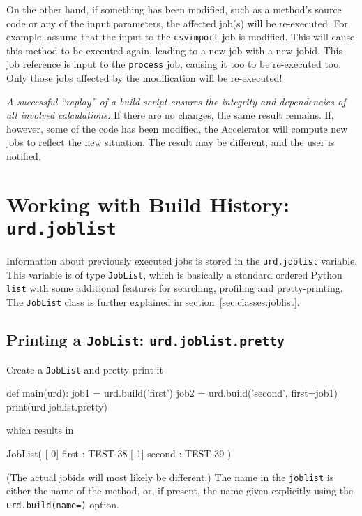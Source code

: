 On the other hand, if something has been modified, such as a method's
source code or any of the input parameters, the affected job(s) will
be re-executed.  For example, assume that the input to
the \texttt{csvimport} job is modified.  This will cause this method
to be executed again, leading to a new job with a new jobid.  This job
reference is input to the \texttt{process} job, causing it too to be
re-executed too.  Only those jobs affected by the modification will be
re-executed!

\textsl{A successful ``replay'' of a build script ensures the integrity and
dependencies of all involved calculations.}  If there are no changes,
the same result remains.  If, however, some of the code has been
modified, the Accelerator will compute new jobs to reflect the new
situation.  The result may be different, and the user is notified.


\section{Working with Build History:  \texttt{urd.joblist}}
\label{sec:joblist}

Information about previously executed jobs is stored in
the \texttt{urd.joblist} variable.  This variable is of
type \texttt{JobList}, which is basically a standard ordered
Python \texttt{list} with some additional features for searching,
profiling and pretty-printing.  The \texttt{JobList} class is further
explained in section~\ref{sec:classes:joblist}.



\subsection{Printing a \texttt{JobList}:  \texttt{urd.joblist.pretty}}
Create a \texttt{JobList} and pretty-print it
\begin{python}
def main(urd):
    job1 = urd.build('first')
    job2 = urd.build('second', first=job1)
    print(urd.joblist.pretty)
\end{python}
which results in
\begin{shell}
JobList(
   [  0]  first : TEST-38
   [  1] second : TEST-39
)
\end{shell}
(The actual jobids will most likely be different.)  The name in
the \texttt{joblist} is either the name of the method, or, if present,
the name given explicitly using the \texttt{urd.build(name=)} option.



